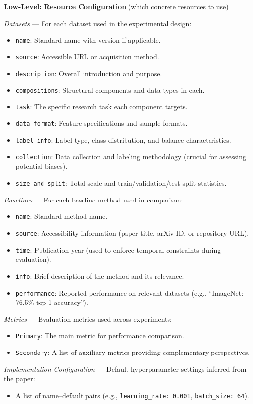 \begin{tcolorbox}
\textbf{Low-Level: Resource Configuration} (which concrete resources to use)

\medskip
\textit{Datasets} — For each dataset used in the experimental design:
\begin{itemize}[nosep,leftmargin=12pt]
	\item \texttt{name}: Standard name with version if applicable.
	\item \texttt{source}: Accessible URL or acquisition method.
	\item \texttt{description}: Overall introduction and purpose.
	\item \texttt{compositions}: Structural components and data types in each.
	\item \texttt{task}: The specific research task each component targets.
	\item \texttt{data\_format}: Feature specifications and sample formats.
	\item \texttt{label\_info}: Label type, class distribution, and balance characteristics.
	\item \texttt{collection}: Data collection and labeling methodology (crucial for assessing potential biases).
	\item \texttt{size\_and\_split}: Total scale and train/validation/test split statistics.
\end{itemize}
\medskip

\textit{Baselines} — For each baseline method used in comparison:
\begin{itemize}[nosep,leftmargin=12pt]
	\item \texttt{name}: Standard method name.
	\item \texttt{source}: Accessibility information (paper title, arXiv ID, or repository URL).
	\item \texttt{time}: Publication year (used to enforce temporal constraints during evaluation).
	\item \texttt{info}: Brief description of the method and its relevance.
	\item \texttt{performance}: Reported performance on relevant datasets (e.g., ``ImageNet: 76.5\% top-1 accuracy'').
\end{itemize}
\medskip

\textit{Metrics} — Evaluation metrics used across experiments:
\begin{itemize}[nosep,leftmargin=12pt]
	\item \texttt{Primary}: The main metric for performance comparison.
	\item \texttt{Secondary}: A list of auxiliary metrics providing complementary perspectives.
\end{itemize}
\medskip

\textit{Implementation Configuration} — Default hyperparameter settings inferred from the paper:
\begin{itemize}[nosep,leftmargin=12pt]
	\item A list of name--default pairs (e.g., \texttt{learning\_rate: 0.001}, \texttt{batch\_size: 64}).
\end{itemize}
\end{tcolorbox}

